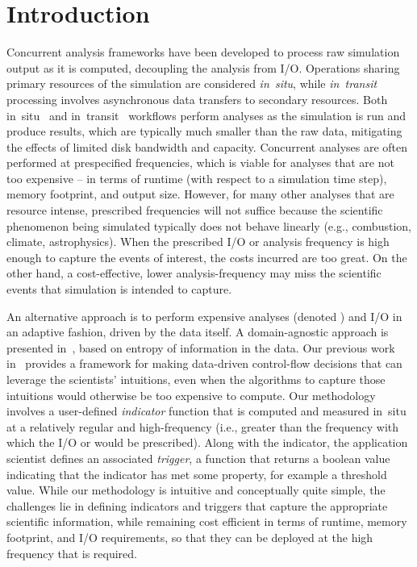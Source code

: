 \documentclass{sig-alternate}
\begin{document}
\section{Introduction}
Concurrent analysis frameworks have been developed to process  raw simulation output as it is computed, decoupling the analysis from I/O. 
Operations sharing primary resources of the simulation are considered \emph{in~situ}, while \emph{in~transit} processing involves asynchronous data transfers to secondary resources. 
Both in~situ~\cite{Yu2010,visit:2011, paraview:ldav11}  and
in~transit~\cite{glean:ldav11, JITStaging, Bennett:2012} workflows perform
analyses as the simulation is run and produce results, which are typically much
smaller than the raw data, mitigating the effects of limited disk bandwidth and
capacity.  Concurrent analyses are often performed at prespecified frequencies, which is  viable  for analyses that are not too expensive -- in terms of runtime
(with respect to a simulation time step), memory footprint, and output size.  However, for many  other analyses 
that are resource intense, prescribed frequencies will not suffice because the 
scientific phenomenon being simulated typically does not behave linearly (e.g., combustion, climate,
astrophysics).  When the prescribed I/O or analysis frequency  is high enough to capture the events of interest, the costs incurred are 
too great. On the other hand, a cost-effective, lower analysis-frequency  may miss the scientific events that simulation is intended to capture.

An alternative approach is to perform expensive analyses (denoted ) and I/O in an
adaptive fashion, driven by the data itself.   A domain-agnostic approach is
presented in~\cite{nouanesengsy2014adr,
modelPaper}, based on entropy of information in the data.   
Our previous work in~\cite{cema-insitu} provides a framework for 
making data-driven control-flow decisions that can leverage the scientists'
intuitions, even when the algorithms to capture those
intuitions would otherwise be too expensive to compute. 
Our methodology involves a user-defined \emph{indicator} function that is computed and measured in~situ 
at a relatively regular and high-frequency (i.e., greater than the frequency
with which the I/O or  would be prescribed).  Along with the indicator, the application scientist
defines an associated \emph{trigger}, a function that returns a boolean value
indicating that the indicator has met some property, for example a threshold
value.  While our  methodology is intuitive and conceptually quite simple,
the challenges lie in defining indicators and triggers that capture the appropriate
scientific information, while remaining cost efficient in terms of runtime, memory footprint, and I/O
requirements, so that they can be deployed at the high frequency that is required.  
\end{document}
